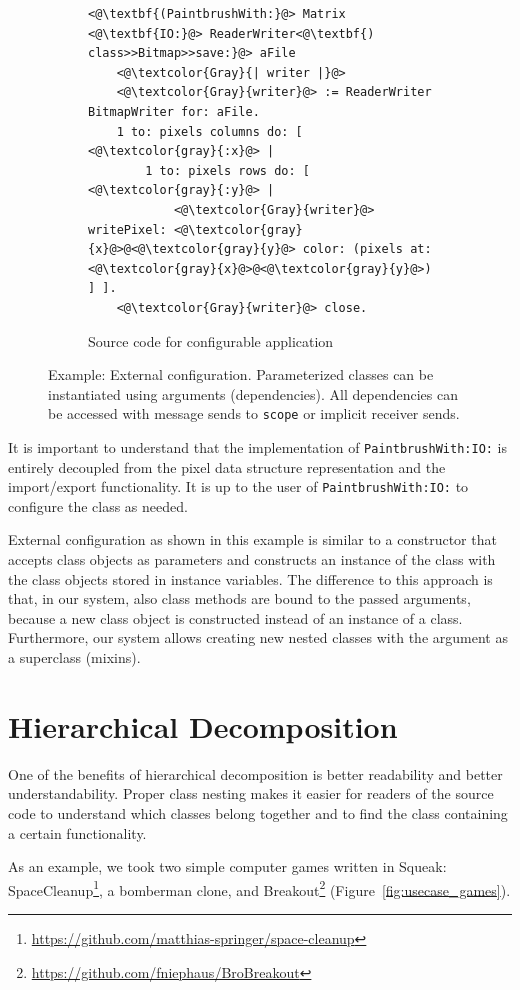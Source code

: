 \begin{figure}[!htp]
\begin{subfigure}[b]{\textwidth}
\begin{lstlisting}
<@\textbf{(PaintbrushWith:}@> Matrix <@\textbf{IO:}@> ReaderWriter<@\textbf{) class>>Bitmap>>save:}@> aFile
    <@\textcolor{Gray}{| writer |}@>
    <@\textcolor{Gray}{writer}@> := ReaderWriter BitmapWriter for: aFile.
    1 to: pixels columns do: [ <@\textcolor{gray}{:x}@> |
        1 to: pixels rows do: [ <@\textcolor{gray}{:y}@> | 
            <@\textcolor{Gray}{writer}@> writePixel: <@\textcolor{gray}{x}@>@<@\textcolor{gray}{y}@> color: (pixels at: <@\textcolor{gray}{x}@>@<@\textcolor{gray}{y}@>) ] ].
    <@\textcolor{Gray}{writer}@> close.
\end{lstlisting}
\caption{Source code for configurable application}
\end{subfigure}
\caption[Example: External configuration]{Example: External configuration. Parameterized classes can be instantiated using arguments (dependencies). All dependencies can be accessed with message sends to \texttt{scope} or implicit receiver sends.}
\label{fig:use_paintbrush}
\end{figure}

It is important to understand that the implementation of \texttt{PaintbrushWith:IO:} is entirely decoupled from the pixel data structure representation and the import/export functionality. It is up to the user of \texttt{PaintbrushWith:IO:} to configure the class as needed.

External configuration as shown in this example is similar to a constructor that accepts class objects as parameters and constructs an instance of the class with the class objects stored in instance variables. The difference to this approach is that, in our system, also class methods are bound to the passed arguments, because a new class object is constructed instead of an instance of a class. Furthermore, our system allows creating new nested classes with the argument as a superclass (mixins).

\section{Hierarchical Decomposition}
\label{sec:usecase_hierach_decomp}
One of the benefits of hierarchical decomposition is better readability and better understandability. Proper class nesting makes it easier for readers of the source code to understand which classes belong together and to find the class containing a certain functionality.

As an example, we took two simple computer games written in Squeak: SpaceCleanup\footnote{\url{https://github.com/matthias-springer/space-cleanup}}, a bomberman clone, and Breakout\footnote{\url{https://github.com/fniephaus/BroBreakout}} (Figure~\ref{fig:usecase_games}).

